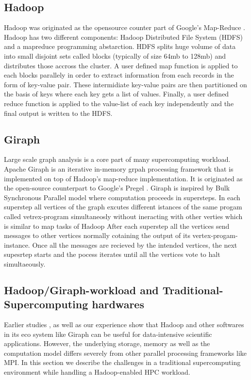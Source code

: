 \documentclass[conference]{IEEEtran}
\begin{document}
\subsection {Hadoop}
Hadoop was originated as the opensource counter part of Google's Map-Reduce \cite{fw:mapreduce}.
Hadoop has two different components: Hadoop Distributed File System (HDFS) and a mapreduce programming abstarction.
HDFS splits huge volume of data into small disjoint sets called blocks (typically of size 64mb to 128mb) and distributes those accross the cluster.
A user defined map function is applied to each blocks parallely in order to extract information from each records in the form of key-value pair.
These intermidiate key-value pairs are then partitioned on the basis of keys where each key gets a list of values.
Finally, a user defined reduce function is applied to the value-list of each key independently and the final output is written to the HDFS.
 
\subsection {Giraph}
Large scale graph analysis is a core part of many supercomputing workload.
Apache Giraph is an iterative in-memory grpah processing framework that is implemented on top of Hadoop's map-reduce implementation.
It is originated as the open-source counterpart to Google's Pregel \cite{fw:pregel}.
Giraph is inspired by Bulk Synchronous Parallel model \cite{fw:bsp} where computation proceeds in supersteps.
In each superstep all vertices of the graph excutes different istances of the same progam called vetrex-program simultaneosly without ineracting with other verties which is similar to map tasks of Hadoop
After each superstep all the vertices send messages to other vertices normally cotaining the output of its vertex-progam-instance.
Once all the messages are recieved by the intended vertices, the next supesrtep starts and the pocess iterates until all the vertices vote to halt simultaeously.

\subsection {Hadoop/Giraph-workload and Traditional-Supercomputing hardwares}
Earlier studies \cite{schadoop:fadika}, \cite{schadoop:matsunaga} as well as our experience show that Hadoop and other softwares in its eco system like Giraph can be useful for data-intensive scientific applications. However, the underlying storage, memory as well as the computation model differs severely from other parallel processing frameworks like MPI.
In this section we describe the challenges in a traditional supercomputing environment while handling a Hadoop-enabled HPC workload.
\end{document}

